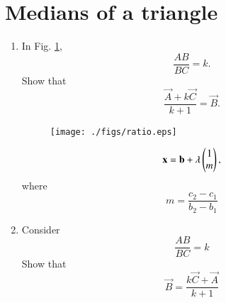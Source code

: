 \documentclass[journal,12pt,twocolumn]{IEEEtran}
\renewcommand\thesection{\arabic{section}}
\begin{document}
\section{Medians of a triangle}
\begin{enumerate}[label=\thesection.\arabic*
,ref=\thesection.\theenumi]
\item In Fig. \ref{fig:ratio},
\begin{equation}
\frac{AB}{BC} = k.
\end{equation}
%
Show that
%
\begin{equation}
\frac{\vec{A}+k\vec{C}}{k+1} = \vec{B}.
\end{equation}
%
\begin{figure}[!hb]
\centering
\texttt{[image: ./figs/ratio.eps]}
\caption{}
\label{fig:ratio}
\end{figure}
\solution
\begin{equation}
\mathbf{x} = \mathbf{b} + \lambda \begin{pmatrix}1 \\ m\end{pmatrix},
\end{equation}
where
\begin{equation}
m = \frac{c_2-c_1}{b_2-b_1}
\end{equation}
%
\item Consider
\begin{equation}
\frac{AB}{BC} = k
\end{equation}
Show that 
\begin{equation}
\vec{B} = \frac{k\vec{C}+\vec{A}}{k+1}
\end{equation}
\end{enumerate}
%
\end{document}

